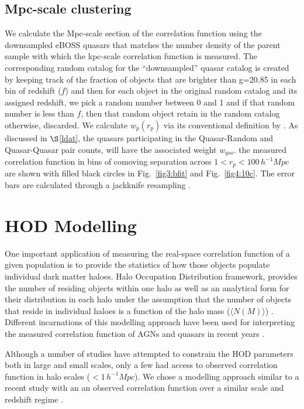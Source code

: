 \documentclass[useAMS,usenatbib]{mn2e}
\begin{document}
\subsection{Mpc-scale clustering}\label{mpcls}

We calculate the Mpc-scale section of the correlation function using the 
downsampled eBOSS quasars that matches the number density of the parent sample 
with which the kpc-scale correlation function is measured. The corresponding 
random catalog for the ``downsampled'' quasar catalog is created by keeping 
track of the fraction of objects that are brighter than g=20.85 in each bin of 
redshift ($f$) and then for each object in the original random catalog and its 
assigned redshift, we pick a random number between 0 and 1 and if that random 
number is less than $f$, then that random object retain in the random catalog 
otherwise, discarded. We calculate $w_p(r_p)$  via its conventional definition by \citet{ls93}. 
As discussed in $\S$\ref{ldat}, the quasars participating in the Quasar-Random and Quasar-Quasar pair counts, will have the associated weight $w_{qso}$. 
the measured correlation function in bins of comoving separation across $1<r_p<100 \, h^{-1} Mpc$ are shown with filled black circles in Fig.\, \ref{fig3:bfit} and Fig.\, \ref{fig4:10c}. The error bars are calculated through a jackknife resampling \citep[see, e.g., eqn. 4 of][]{ef15}.  


\section{HOD Modelling}\label{hodmod}

One important application of measuring the real-space correlation function of a 
given population is to provide the statistics of how those objects populate 
individual dark matter haloes.  Halo Occupation Distribution framework, provides 
the number of residing objects within one halo as well as an analytical form for 
their distribution in each halo under the assumption that the number of objects 
that reside in individual haloes is a function of the halo mass ($\langle 
N(M)\rangle$) \citep{pea00,sel00,sc01}. Different incarnations of this modelling 
approach have been used for interpreting the measured correlation function of 
AGNs and quasars in recent years \citep[see, e.g., 
][]{po04,coil04,Aba05,coi06,coi07,coi09,mi11,ric12,ko12,kru12,ric13,sh13,Coi16,coi17}.  

Although a number of studies have attempted to constrain the HOD parameters both 
in large and small scales, only a few had access to observed correlation 
function in halo scales ($<1 \, h^{-1} Mpc$). We chose a modelling approach 
similar to a recent study with an an observed correlation function over a 
similar scale and redshift regime \citep{ko12}.  
\end{document}
